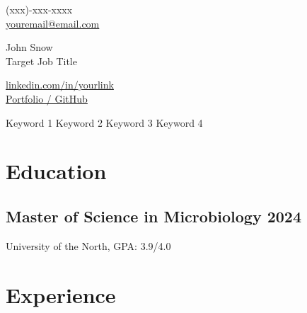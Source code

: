 \documentclass[a4paper,10pt]{article}
\newcommand{\subtext}[1]{#1\par\vspace{-0.2cm}}
\begin{document}
\begin{center}
    \begin{minipage}[b]{0.30\textwidth}
            \large (xxx)-xxx-xxxx \\
            \large \href{mailto:youremail@email.com}{youremail@email.com} 
    \end{minipage}%
    \begin{minipage}[b]{0.40\textwidth}
            \centering
            {\Huge John Snow} \\ 
            \vspace{0.1cm}
            {\color{UI_blue} \Large{Target Job Title}} 
    \end{minipage}%
    \begin{minipage}[b]{0.30\textwidth}
            \flushright \large 
            \href{https://linkedin.com/in/yourlink}{linkedin.com/in/yourlink} \\
            \href{https://portfolio-link.com}{Portfolio / GitHub}
    \end{minipage}   
    \vspace{0.1cm} 
    {\color{UI_blue} \hrulefill}
\end{center}

\vspace{-0.25cm}
\begin{center}
    \textbullet \hspace{0.1cm} Keyword 1 \hspace{0.3cm}
    \textbullet \hspace{0.1cm} Keyword 2 \hspace{0.3cm}
    \textbullet \hspace{0.1cm} Keyword 3 \hspace{0.3cm}
    \textbullet \hspace{0.1cm} Keyword 4
\end{center}

\section{Education}
\subsection*{Master of Science in Microbiology \hfill 2024} 
\subtext{University of the North, GPA: 3.9/4.0}

\section{Experience}
\end{document}
